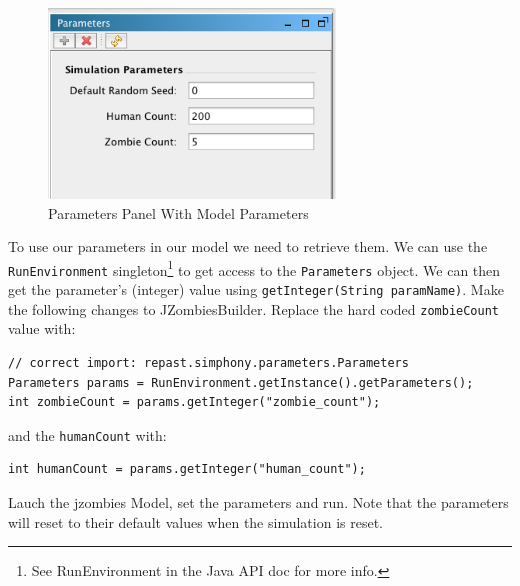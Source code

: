 \documentclass[11pt]{amsart}
\begin{document}
\begin{figure}[h]
\begin{center}
\vspace{.2in}
\centerline {
\includegraphics[width=3in]{GettingStartedImages/params2.png}
}
\caption{Parameters Panel With Model Parameters}
\label{fig:params2}
\end{center}
\end{figure}

To use our parameters in our model we need to retrieve them. We can use the \texttt{RunEnvironment} singleton\footnote{See RunEnvironment in the Java API doc for more info.} to get access to the \texttt{Parameters} object. We can then get the parameter's (integer) value using \texttt{getInteger(String paramName)}. Make the following changes to JZombiesBuilder.  Replace the hard coded \texttt{zombieCount} value with:

\noindent\begin{minipage}[h]{\textwidth}
\vspace{.2in}
\lstset{language=java,caption=}
\begin{lstlisting}
// correct import: repast.simphony.parameters.Parameters
Parameters params = RunEnvironment.getInstance().getParameters();
int zombieCount = params.getInteger("zombie_count");
\end{lstlisting}
\vspace{.2in}
\end{minipage}

and the \texttt{humanCount} with:

\noindent\begin{minipage}[h]{\textwidth}
\vspace{.2in}
\lstset{language=java,caption=}
\begin{lstlisting}
int humanCount = params.getInteger("human_count");
\end{lstlisting}

\end{minipage}

Lauch the jzombies Model, set the parameters and run. Note that the parameters will reset to their default values when the simulation is reset.
\end{document}
